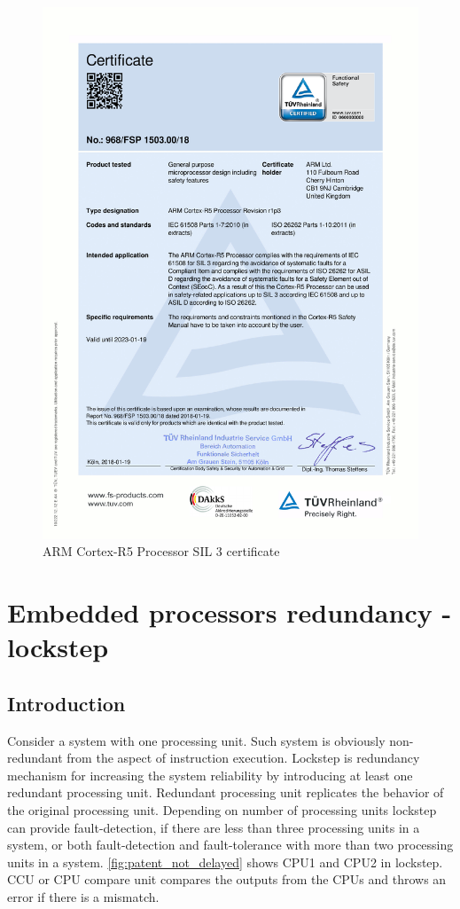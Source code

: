 \begin{figure}[H]

      \centering
      \includegraphics[width=0.9\linewidth]{images/cortex_r_certificate.pdf}
      \caption{ARM Cortex-R5 Processor  SIL 3 certificate}
      \label{fig:func_safety_certificate}
    
\end{figure}

\section{Embedded processors redundancy - lockstep}

\subsection{Introduction}

Consider a system with one processing unit. Such system is obviously non-redundant from the
aspect of instruction execution. Lockstep is redundancy mechanism for increasing the system reliability
by introducing at least one redundant processing unit. Redundant processing unit replicates the behavior of
the original processing unit. Depending on number of processing units lockstep can provide fault-detection, if there are less than three processing units in a system, or both fault-detection and
fault-tolerance with more than two processing units in a system. \citep{ipavic_lockstep} \autoref{fig:patent_not_delayed} shows CPU1 and CPU2 in lockstep. CCU or CPU compare unit compares the outputs from the CPUs and throws an error if there is a mismatch.

